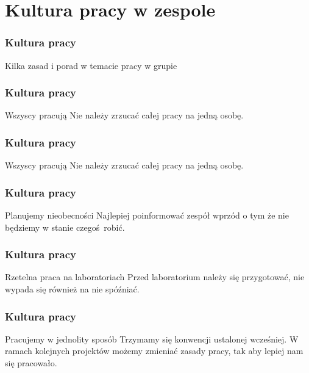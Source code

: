 \section{Kultura pracy w zespole}
\label{kultura}


\begin{frame}
    \frametitle{Kultura pracy}
    \begin{block}{Kilka zasad i porad w temacie pracy w grupie}
    \end{block}
\end{frame}


\begin{frame}
    \frametitle{Kultura pracy}
    \begin{block}{Wszyscy pracują}
        Nie należy zrzucać całej pracy na jedną osobę.
    \end{block}
\end{frame}

\begin{frame}
    \frametitle{Kultura pracy}
    \begin{block}{Wszyscy pracują}
        Nie należy zrzucać całej pracy na jedną osobę.
    \end{block}
\end{frame}


\begin{frame}
    \frametitle{Kultura pracy}
    \begin{block}{Planujemy nieobecności}
        Najlepiej poinformować zespół wprzód o tym że nie będziemy w stanie czegoś robić.
    \end{block}
\end{frame}

\begin{frame}
    \frametitle{Kultura pracy}
    \begin{block}{Rzetelna praca na laboratoriach}
        Przed laboratorium należy się przygotować, nie wypada się również na nie spóźniać.
    \end{block}
\end{frame}

\begin{frame}
    \frametitle{Kultura pracy}
    \begin{block}{Pracujemy w jednolity sposób}
        Trzymamy się konwencji ustalonej wcześniej. W ramach kolejnych projektów możemy zmieniać
        zasady pracy, tak aby lepiej nam się pracowało.
    \end{block}
\end{frame}

